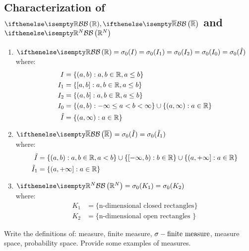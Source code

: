 \subsection{Characterization of \texorpdfstring{$\B[\R],\B[\Rcomp]$}{B(R), B(Rcomp)} and \texorpdfstring{$\B[\R^N]$}{B(Rn)}}
\begin{enumerate}
    \item $\B[\R]=\sigma_0(I)=\sigma_0(I_1)=\sigma_0(I_2)=\sigma_0(I_0)=\sigma_0(\hat{I})$\\
    where:
    \begin{align*}
        I&=\{ (a,b): a,b \in \mathbb{R}, a\leq b \} \\
        I_1&=\{ [a,b]: a,b \in \mathbb{R}, a\leq b \} \\
        I_2&=\{ (a,b]: a,b \in \mathbb{R}, a\leq b \} \\
        I_0&=\{ (a,b): -\infty\leq a < b <\infty \} \cup \{ (a,\infty): a\in\mathbb{R} \} \\
        \hat{I}&=\{ (a,\infty): a\in\mathbb{R} \}
    \end{align*}
    \item $\B[\Rcomp]=\sigma_0(\tilde{I})=\sigma_0(\tilde{I}_1)$\\
    where:
    \begin{align*}
        \tilde{I} &= \{ (a,b): a,b \in \mathbb{R}, a < b \} \cup \{ [-\infty,b): b\in\mathbb{R} \} \cup \{ (a,+\infty] : a\in\mathbb{R} \} \\
        \tilde{I}_1 &= \{ (a,+\infty] : a\in\mathbb{R} \}
    \end{align*}
    \item $\B[\R^N] = \sigma_0(K_1)=\sigma_0(K_2)$\\
    where:
    \begin{align*}
        K_1 &= \{ \text{n-dimensional closed rectangles}\}\\
        K_2 &= \{ \text{n-dimensional open rectangles }\}
    \end{align*}
\end{enumerate}

\question
Write the definitions of: measure, finite measure, $\sigma-\text{finite measure}$, measure space, probability
space. Provide some examples of measures.

